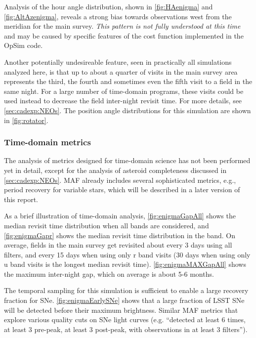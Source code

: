 Analysis of the hour angle distribution, shown in
\autoref{fig:HAenigma} and \autoref{fig:AltAzenigma}, reveals a strong
bias towards observations west from the meridian for the main survey.
{\it This pattern is not fully understood at this time} and may be
caused by specific features of the cost function implemented in the
OpSim code.

Another potentially undesireable feature, seen in practically all
simulations analyzed here, is that up to about a quarter of visits in
the main survey area represents the third, the fourth and sometimes
even the fifth visit to a field in the same night. For a large number
of time-domain programs, these visits could be used instead to
decrease the field inter-night revisit time. For more details, see
\autoref{sec:cadexp:NEOs}. The position angle distributions for this simulation
are shown in \autoref{fig:rotator}.


\subsubsection{Time-domain metrics}

The analysis of metrics designed for time-domain science has not been
performed yet in detail, except for the analysis of asteroid
completeness discussed in \autoref{sec:cadexp:NEOs}. MAF already includes
several sophisticated metrics, e.g., period recovery for variable
stars, which will be described in a later version of this report.

As a brief illustration of time-domain analysis,
\autoref{fig:enigmaGapAll} shows the median revisit time distribution
when all bands are considered, and \autoref{fig:enigmaGapr} shows the
median revisit time distribution in the band.  On average, fields in
the main survey get revisited about every 3 days using all filters,
and every 15 days when using only r band visits (30 days when using
only u band visits is the longest median revisit time).
\autoref{fig:enigmaMAXGapAll} shows the maximum inter-night gap, which
on average is about 5-6 months.

The temporal sampling for this simulation is sufficient to enable a
large recovery fraction for SNe. \autoref{fig:enigmaEarlySNe} shows
that a large fraction of LSST SNe will be detected before their
maximum brightness. Similar MAF metrics that explore various quality
cuts on SNe light curves (e.g. ``detected at least 6 times, at least 3
pre-peak, at least 3 post-peak, with observations in at least 3
filters'').

